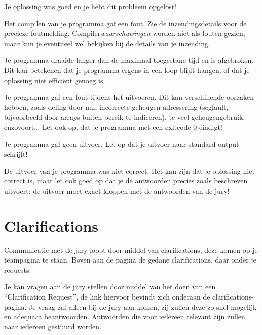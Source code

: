 \documentclass[11pt,a4paper]{article}
\begin{document}
\begin{description}[\setleftmargin{4.5cm}]
\item[CORRECT]
Je oplossing was goed en je hebt dit probleem opgelost!

\item[COMPILER-ERROR]
Het compilen van je programma gaf een fout. Zie de inzendingsdetails
voor de precieze foutmelding. Compiler\emph{waarschuwingen} worden
niet als fouten gezien, maar kun je eventueel wel bekijken bij de
details van je inzending.

\item[TIMELIMIT]
Je programma draaide langer dan de maximaal toegestane tijd en is
afgebroken. Dit kan betekenen dat je programma ergens in een loop
blijft hangen, of dat je oplossing niet effici\"ent genoeg is.

\item[RUN-ERROR]
Je programma gaf een fout tijdens het uitvoeren. Dit kan verschillende
oorzaken hebben, zoals deling door nul, incorrecte geheugen adressering
(segfault, bijvoorbeeld door arrays buiten bereik te indiceren), te
veel geheugengebruik, enzovoort\dots\ 
Let ook op, dat je programma met een exitcode 0 eindigt!

\item[NO-OUTPUT]
Je programma gaf geen uitvoer. Let op dat je uitvoer naar standard
output schrijft!

\item[WRONG-ANSWER]
De uitvoer van je programma was niet correct. Het kan zijn dat je
oplossing niet correct is, maar let ook goed op dat je de antwoorden
precies zoals beschreven uitvoert: de uitvoer moet exact kloppen met
de antwoorden van de jury!
\end{description}

\section{Clarifications}

Communicatie met de jury loopt door middel van clarifications, deze
komen op je teampagina te staan.  Boven aan de pagina de gedane
clarifications, daar onder je requests.

Je kan vragen aan de jury stellen door middel van het doen van een
``Clarification Request'', de link hiervoor bevindt zich onderaan de
clarifications-pagina.  Je vraag zal alleen bij de jury aan komen, zij
zullen deze zo snel mogelijk en adequaat beantwoorden. Antwoorden die
voor iedereen relevant zijn zullen naar iedereen gestuurd worden.
\end{document}

